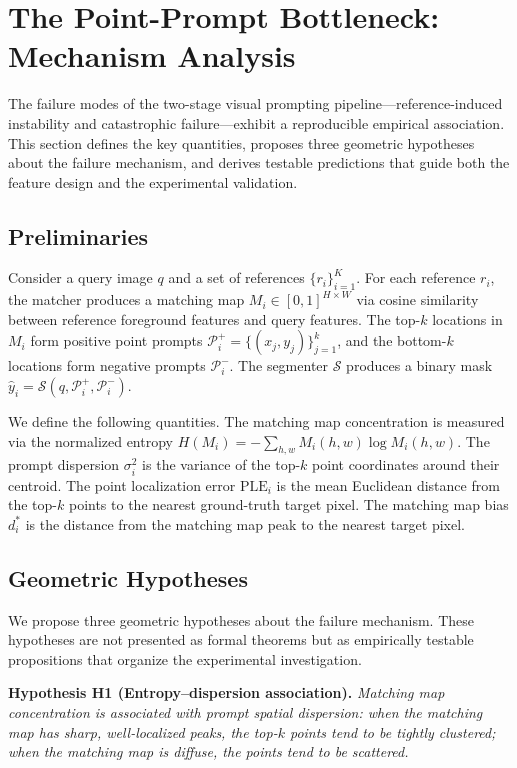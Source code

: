 \documentclass[10pt,twocolumn,letterpaper]{article}
\begin{document}
\section{The Point-Prompt Bottleneck: Mechanism Analysis}
\label{sec:theory}

The failure modes of the two-stage visual prompting pipeline---reference-induced
instability and catastrophic failure---exhibit a reproducible empirical
association. This section defines the key quantities, proposes three geometric
hypotheses about the failure mechanism, and derives testable predictions that
guide both the feature design and the experimental validation.

\subsection{Preliminaries}

Consider a query image $q$ and a set of references $\{r_i\}_{i=1}^K$. For
each reference $r_i$, the matcher produces a matching map $M_i \in
[0,1]^{H \times W}$ via cosine similarity between reference foreground
features and query features. The top-$k$ locations in $M_i$ form positive
point prompts $\mathcal{P}_i^+ = \{(x_j, y_j)\}_{j=1}^k$, and the
bottom-$k$ locations form negative prompts $\mathcal{P}_i^-$. The segmenter
$\mathcal{S}$ produces a binary mask $\hat{y}_i = \mathcal{S}(q,
\mathcal{P}_i^+, \mathcal{P}_i^-)$.

We define the following quantities. The matching map concentration is
measured via the normalized entropy $H(M_i) = -\sum_{h,w} M_i(h,w) \log
M_i(h,w)$. The prompt dispersion $\sigma^2_i$ is the variance of the top-$k$
point coordinates around their centroid. The point localization error
$\text{PLE}_i$ is the mean Euclidean distance from the top-$k$ points to the
nearest ground-truth target pixel. The matching map bias $d^*_i$ is the
distance from the matching map peak to the nearest target pixel.

\subsection{Geometric Hypotheses}

We propose three geometric hypotheses about the failure mechanism. These
hypotheses are not presented as formal theorems but as empirically testable
propositions that organize the experimental investigation.

\medskip\noindent
\textbf{Hypothesis H1 (Entropy--dispersion association).}
\emph{Matching map concentration is associated with prompt spatial
dispersion: when the matching map has sharp, well-localized peaks, the
top-$k$ points tend to be tightly clustered; when the matching map is
diffuse, the points tend to be scattered.}
\end{document}
